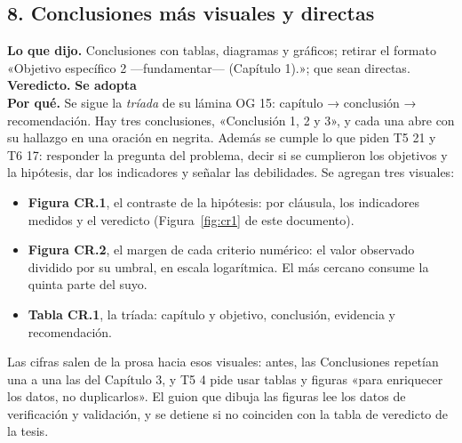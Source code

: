 \documentclass[11pt,a4paper]{article}
\newcommand{\adopta}{\textcolor{adopta}{\textbf{Se adopta}}}
\begin{document}
\subsection*{8. Conclusiones más visuales y directas}
\textbf{Lo que dijo.} Conclusiones con tablas, diagramas y gráficos; retirar el formato «Objetivo específico 2 ---fundamentar--- (Capítulo 1).»; que sean directas.\\
\textbf{Veredicto.} \adopta{}\\
\textbf{Por qué.} Se sigue la \emph{tríada} de su lámina OG 15: capítulo → conclusión → recomendación. Hay tres conclusiones, «Conclusión 1, 2 y 3», y cada una abre con su hallazgo en una oración en negrita. Además se cumple lo que piden T5 21 y T6 17: responder la pregunta del problema, decir si se cumplieron los objetivos y la hipótesis, dar los indicadores y señalar las debilidades. Se agregan tres visuales:
\begin{itemize}
    \item \textbf{Figura CR.1}, el contraste de la hipótesis: por cláusula, los indicadores medidos y el veredicto (Figura~\ref{fig:cr1} de este documento).
    \item \textbf{Figura CR.2}, el margen de cada criterio numérico: el valor observado dividido por su umbral, en escala logarítmica. El más cercano consume la quinta parte del suyo.
    \item \textbf{Tabla CR.1}, la tríada: capítulo y objetivo, conclusión, evidencia y recomendación.
\end{itemize}
Las cifras salen de la prosa hacia esos visuales: antes, las Conclusiones repetían una a una las del Capítulo 3, y T5 4 pide usar tablas y figuras «para enriquecer los datos, no duplicarlos». El guion que dibuja las figuras lee los datos de verificación y validación, y se detiene si no coinciden con la tabla de veredicto de la tesis.
\end{document}
